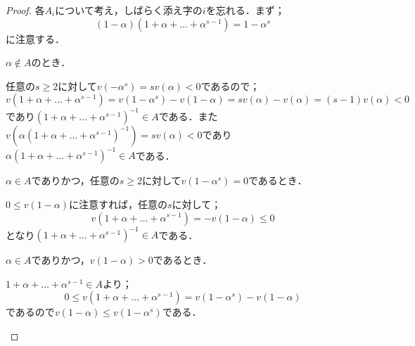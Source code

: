 \begin{proof}
	各$A_i$について考え，しばらく添え字の$i$を忘れる．まず；
	\[(1-\alpha)(1+\alpha+\dots+\alpha^{s-1})=1-\alpha^s\]
	に注意する．
	\begin{step}
	\item 
		$\alpha\not\in A$のとき．
		
		任意の$s\geq 2$に対して$v(-\alpha^s)=sv(\alpha)<0$であるので；
		\[v(1+\alpha+\dots+\alpha^{s-1})=v(1-\alpha^s)-v(1-\alpha)=sv(\alpha)-v(\alpha)=(s-1)v(\alpha)<0\]
		であり$(1+\alpha+\dots+\alpha^{s-1})^{-1}\in A$である．また$v(\alpha(1+\alpha+\dots+\alpha^{s-1})^{-1})=sv(\alpha)<0$であり$\alpha(1+\alpha+\dots+\alpha^{s-1})^{-1}\in A$である．
	\item
		$\alpha\in A$でありかつ，任意の$s\geq 2$に対して$v(1-\alpha^s)=0$であるとき．
		
		$0\leq v(1-\alpha)$に注意すれば，任意の$s$に対して；
		\[v(1+\alpha+\dots+\alpha^{s-1})=-v(1-\alpha)\leq 0\]
		となり$(1+\alpha+\dots+\alpha^{s-1})^{-1}\in A$である．
		
	\item 
		$\alpha\in A$でありかつ，$v(1-\alpha)>0$であるとき．
		
		$1+\alpha+\dots+\alpha^{s-1}\in A$より；
		\[0\leq v(1+\alpha+\dots+\alpha^{s-1})=v(1-\alpha^s)-v(1-\alpha)\]
		であるので$v(1-\alpha)\leq v(1-\alpha^s)$である．
	\end{step}
\end{proof}